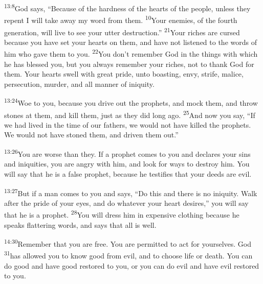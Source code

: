 \documentclass[openany,12pt,english]{book}
\newenvironment{para}{\par\pretolerance=100\tolerance=200\setlength{\emergencystretch}{0.6em}\relax}{\par}
\begin{document}
\begin{para}
    \textsuperscript{13:8}\thinspace{}God says, “Be\-cause of the hard\-ness of the hearts of the peo\-ple, un\-less they re\-pent I will take a\-way my word from them.
    \textsuperscript{10}\thinspace{}Your enemies, of the fourth gen\-er\-a\-tion, will live to see your ut\-ter de\-struc\-tion.”
    \textsuperscript{21}\thinspace{}Your rich\-es are curs\-ed be\-cause you have set your hearts on them, and have not listened to the words of him who gave them to you.
    \textsuperscript{22}\thinspace{}You don't re\-mem\-ber God in the things with which he has bless\-ed you, but you al\-ways re\-mem\-ber your rich\-es, not to thank God for them. Your hearts swell with great pride, un\-to boasting, en\-vy, strife, mal\-ice, per\-se\-cu\-tion, mur\-der, and all man\-ner of in\-iq\-ui\-ty.
\end{para}

\begin{para}
    \textsuperscript{13:24}\thinspace{}Woe to you, be\-cause you drive out the prophets, and mock them, and throw stones at them, and kill them, just as they did long a\-go.
    \textsuperscript{25}\thinspace{}And now you say, “If we had lived in the time of our fathers, we would not have killed the prophets. We would not have stoned them, and driv\-en them out.”
\end{para}

\begin{para}
    \textsuperscript{13:26}\thinspace{}You are worse than they. If a proph\-et co\-mes to you and declares your sins and iniquities, you are an\-gry with him, and look for ways to de\-stroy him. You will say that he is a false proph\-et, be\-cause he testifies that your deeds are evil.
\end{para}

\begin{para}
    \textsuperscript{13:27}\thinspace{}But if a man co\-mes to you and says, “Do this and there is no in\-iq\-ui\-ty. Walk af\-ter the pride of your eyes, and do what\-ev\-er your heart desires,” you will say that he is a proph\-et.
    \textsuperscript{28}\thinspace{}You will dress him in ex\-pen\-sive cloth\-ing be\-cause he speaks flattering words, and says that all is well.
\end{para}

\begin{para}
    \textsuperscript{14:30}\thinspace{}Re\-mem\-ber that you are free. You are permitted to act for your\-selves. God
    \textsuperscript{31}\thinspace{}has al\-lowed you to know good from evil, and to choose life or death. You can do good and have good re\-stored to you, or you can do evil and have evil re\-stored to you.
\end{para}
\end{document}
